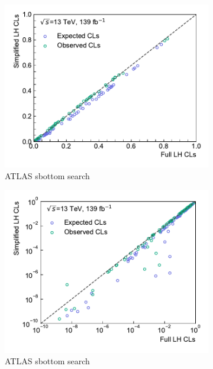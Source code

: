 \begin{figure}
	\centering
	\begin{subfigure}[b]{0.5\textwidth}
		\centering\includegraphics[width=\textwidth]{cls_scatter_sbottom_lin}
		\caption{ATLAS sbottom search~\cite{SUSY-2018-31}}
	\end{subfigure}\hfill
	\begin{subfigure}[b]{0.5\textwidth}
		\centering\includegraphics[width=\textwidth]{cls_scatter_sbottom_log}
		\caption{ATLAS sbottom search~\cite{SUSY-2018-31}}
	\end{subfigure}\hfill
	\begin{subfigure}[b]{0.5\textwidth}

\end{subfigure}
\end{figure}
